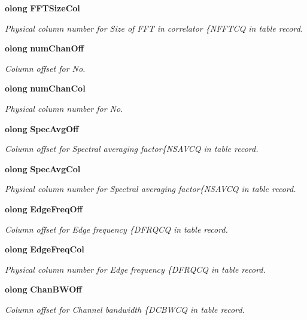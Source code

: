 \begin{CompactItemize}
{\bf olong} {\bf FFTSize\-Col}
\begin{CompactList}\small\item\em Physical column number for Size of FFT in correlator \{NFFTCQ in table record. \item\end{CompactList}\item 
{\bf olong} {\bf num\-Chan\-Off}
\begin{CompactList}\small\item\em Column offset for No. \item\end{CompactList}\item 
{\bf olong} {\bf num\-Chan\-Col}
\begin{CompactList}\small\item\em Physical column number for No. \item\end{CompactList}\item 
{\bf olong} {\bf Spec\-Avg\-Off}
\begin{CompactList}\small\item\em Column offset for Spectral averaging factor\{NSAVCQ in table record. \item\end{CompactList}\item 
{\bf olong} {\bf Spec\-Avg\-Col}
\begin{CompactList}\small\item\em Physical column number for Spectral averaging factor\{NSAVCQ in table record. \item\end{CompactList}\item 
{\bf olong} {\bf Edge\-Freq\-Off}
\begin{CompactList}\small\item\em Column offset for Edge frequency \{DFRQCQ in table record. \item\end{CompactList}\item 
{\bf olong} {\bf Edge\-Freq\-Col}
\begin{CompactList}\small\item\em Physical column number for Edge frequency \{DFRQCQ in table record. \item\end{CompactList}\item 
{\bf olong} {\bf Chan\-BWOff}
\begin{CompactList}\small\item\em Column offset for Channel bandwidth \{DCBWCQ in table record. \item\end{CompactList}\item 

\end{CompactItemize}
